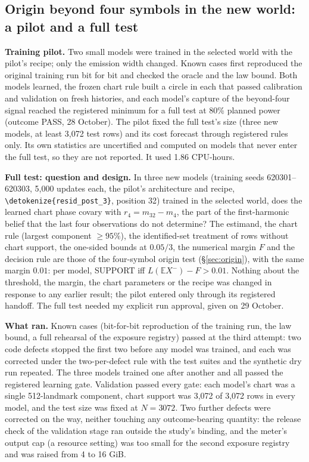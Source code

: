 \documentclass[11pt,a4paper]{article}
\newcommand{\E}{\mathbb{E}}
\DeclareRobustCommand{\_}{\ifmmode\origunderscore\else\textunderscore\allowbreak\fi}
\DeclareRobustCommand{\fpath}[1]{\begingroup\small\expandafter\nolinkurl\expandafter{\detokenize{#1}}\endgroup}
\begin{document}
\subsection{Origin beyond four symbols in the new world: a pilot and a full test}\label{sec:hwsc}
\textbf{Training pilot.} Two small models were trained in the selected world with the pilot's
recipe; only the emission width changed. Known cases first reproduced the original training run
bit for bit and checked the oracle and the law bound. Both models learned, the frozen chart rule
built a circle in each that passed calibration and validation on fresh histories, and each
model's capture of the beyond-four signal reached the registered minimum for a full test at
80\% planned power (outcome PASS, 28 October). The pilot fixed the full test's size (three new
models, at least 3,072 test rows) and its cost forecast through registered rules only. Its own
statistics are uncertified and computed on models that never enter the full test, so they are
not reported. It used 1.86 CPU-hours.

\textbf{Full test: question and design.} In three new models (training seeds 620301--620303,
5,000 updates each, the pilot's architecture and recipe, \fpath{resid_post_3}, position 32) trained
in the selected world, does the learned chart phase covary with $r_4=m_{32}-m_4$, the part of the
first-harmonic belief that the last four observations do not determine? The estimand, the chart
rule (largest component $\ge95\%$), the identified-set treatment of rows without chart support,
the one-sided bounds at $0.05/3$, the numerical margin $F$ and the decision rule are those of
the four-symbol origin test (\S\ref{sec:origin}), with the same margin $0.01$: per model,
SUPPORT iff $L(\E X^-)-F>0.01$. Nothing about the threshold, the margin, the chart parameters or
the recipe was changed in response to any earlier result; the pilot entered only through its
registered handoff. The full test needed my explicit run approval, given on 29 October.

\textbf{What ran.} Known cases (bit-for-bit reproduction of the training run, the law bound, a full
rehearsal of the exposure registry) passed at the third attempt: two code defects stopped the first
two before any model was trained, and each was corrected under the two-per-defect rule with the
test suites and the synthetic dry run repeated. The three models trained one after another and
all passed the registered learning gate. Validation passed every gate: each model's chart was a
single 512-landmark component, chart support was 3,072 of 3,072 rows in every model, and the test
size was fixed at $N=3072$. Two further defects were corrected on the way, neither touching any
outcome-bearing quantity: the release check of the validation stage ran outside the study's
binding, and the meter's output cap (a resource setting) was too small for the second exposure
registry and was raised from 4 to 16 GiB.
\end{document}
